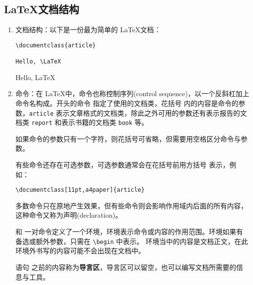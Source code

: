 \subsection{\LaTeX 文档结构}
\begin{enumerate}

\item 文档结构：以下是一份最为简单的 \LaTeX 文档：

\begin{tcolorbox}[sidebyside]
\begin{lstlisting}
\documentclass{article} 

Hello, \LaTeX

\end{lstlisting} 

\tcblower

\begin{center}
Hello, \LaTeX
\end{center}    
\end{tcolorbox}

\item 命令：在 \LaTeX 中，命令也称控制序列(control sequence)，以一个反斜杠加上命令名构成。开头的命令 \newline \boxforcmd{\\documentclass} 指定了使用的文档类，花括号 \boxforcmd{\{\}} 内的内容是命令的参数，\verb|article| 表示文章格式的文档类，除此之外可用的参数还有表示报告的文档类 \verb|report| 和表示书籍的文档类 \verb|book| 等。

如果命令的参数只有一个字符，则花括号可省略，但需要用空格区分命令与参数。

有些命令还存在可选参数，可选参数通常会在花括号前用方括号 \boxforcmd{[]} 表示，例如：

\begin{tcolorbox}
\begin{lstlisting}
\documentclass[11pt,a4paper]{article} 
\end{lstlisting} 
\end{tcolorbox}

多数命令只在原地产生效果，但有些命令则会影响作用域内后面的所有内容，这种命令又称为声明(declaration)。

\boxforcmd{\\begin} 和 \boxforcmd{\\end} 一对命令定义了一个环境，环境表示命令或内容的作用范围。环境如果有备选或额外参数，只需在 \verb|\begin| 中表示。 环境当中的内容是文档正文，在此环境外书写的内容可能不会出现在文档中。

语句 \verb|| 之前的内容称为\textbf{导言区}，导言区可以留空，也可以编写文档所需要的信息与工具。


\end{enumerate}

